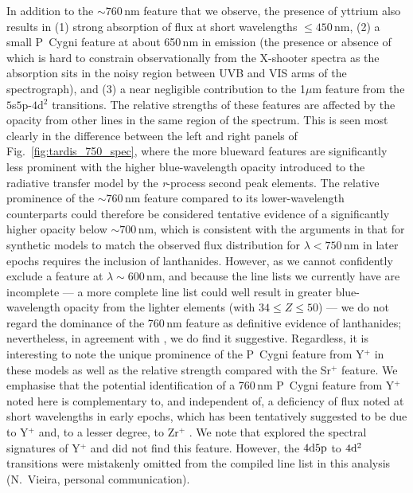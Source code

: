 \documentclass{aa}
\newcommand{\rproc}{\textit{r}-process\xspace}
\begin{document}
In addition to the $\sim760$\,nm feature that we observe, the presence of yttrium also results in (1) strong absorption of flux at short wavelengths $\leq 450$\,nm, (2) a small P~Cygni feature at about 650\,nm in emission (the presence or absence of which is hard to constrain observationally from the X-shooter spectra as the absorption sits in the noisy region between UVB and VIS arms of the spectrograph), and (3) a near negligible contribution to the 1$\mu$m feature from the $5$s$5$p-$4$d$^2$ transitions. The relative strengths of these features are affected by the opacity from other lines in the same region of the spectrum. This is seen most clearly in the difference between the left and right panels of Fig.~\ref{fig:tardis_750_spec}, where the more blueward features are significantly less prominent with the higher blue-wavelength opacity introduced to the radiative transfer model by the \rproc second peak elements. The relative prominence of the $\sim760$\,nm feature compared to its lower-wavelength counterparts could therefore be considered tentative evidence of a significantly higher opacity below $\sim700$\,nm, which is consistent with the arguments in \citet{Gillanders2022} that for synthetic models to match the observed flux distribution for $\lambda<750$\,nm in later epochs requires the inclusion of lanthanides. However, as we cannot confidently exclude a feature at $\lambda \sim600$\,nm, and because the line lists we currently have are incomplete --- a more complete line list could well result in greater blue-wavelength opacity from the lighter elements (with $34 \leq Z \leq 50$) --- we do not regard the dominance of the 760\,nm feature as definitive evidence of lanthanides; nevertheless, in agreement with \citet{Gillanders2022}, we do find it suggestive. Regardless, it is interesting to note the unique prominence of the P~Cygni feature from Y$^+$ in these models as well as the relative strength compared with the Sr$^+$ feature. We emphasise that the potential identification of a 760\,nm P~Cygni feature from Y\(^+\) noted here is complementary to, and independent of, a deficiency of flux noted at short wavelengths in early epochs, which has been tentatively suggested to be due to Y\(^+\) and, to a lesser degree, to Zr\(^+\) \citep{Vieira2023}. We note that \citet{Vieira2023} explored the spectral signatures of Y\(^+\) and did not find this feature. However, the $4{\rm d}5{\rm p}$ to $4{\rm d}^2$ transitions were mistakenly omitted from the compiled line list in this analysis (N.~Vieira, personal communication).
\end{document}
